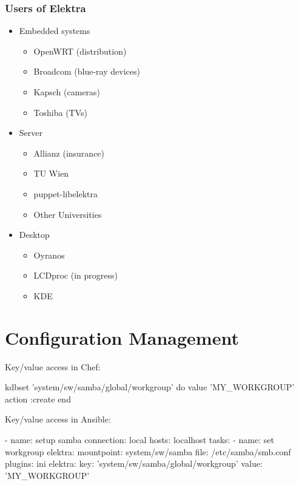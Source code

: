 \begin{frame}
	\frametitle{Users of Elektra}
	\begin{itemize}[<+->]
	\item Embedded systems
	\begin{itemize}
	\item OpenWRT (distribution)
	\item Broadcom (blue-ray devices)
	\item Kapsch (cameras)
	\item Toshiba (TVs)
	\end{itemize}
	\item Server
	\begin{itemize}
	\item Allianz (insurance)
	\item TU Wien
	\item puppet-libelektra
	\item Other Universities
	\end{itemize}
	\item Desktop
	\begin{itemize}
	\item Oyranos
	\item LCDproc (in progress)
	\item KDE
	\end{itemize}
	\end{itemize}
\end{frame}

\section{Configuration Management}

\begin{frame}[fragile]
	Key/value access in Chef:

	\begin{code}[morekeywords={kdbset,do,action,value,end},gobble=4]
	kdbset 'system/sw/samba/global/workgroup' do
		value 'MY_WORKGROUP'
		action :create
	end
	\end{code}
\end{frame}

\begin{frame}[fragile]
	Key/value access in Ansible:

	\begin{code}[morekeywords={name,connection,key,value,elektra,mountpoint,file,plugins,hosts,tasks},gobble=4]
	- name: setup samba
	  connection: local
	  hosts: localhost
	  tasks:
	  - name: set workgroup
	    elektra:
	      mountpoint: system/sw/samba
	      file: /etc/samba/smb.conf
	      plugins: ini
	    elektra:
	      key: 'system/sw/samba/global/workgroup'
	      value: 'MY_WORKGROUP'
	\end{code}
\end{frame}

